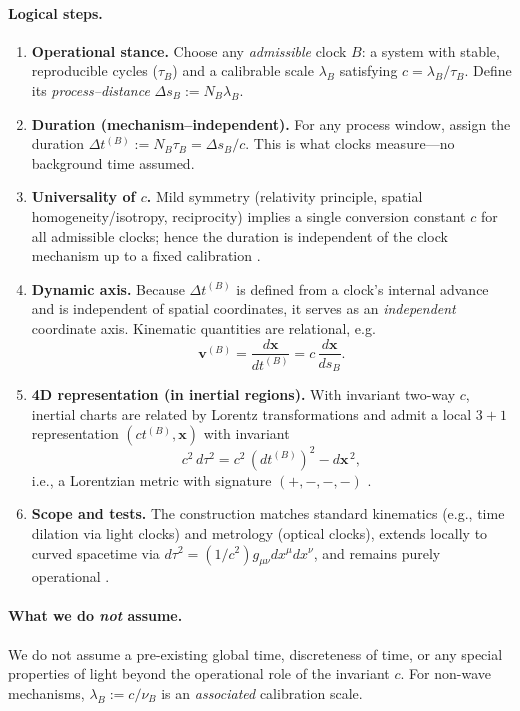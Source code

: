 \documentclass[12pt]{article}
\begin{document}
\paragraph{Logical steps.}
\begin{enumerate}
  \item \textbf{Operational stance.} Choose any \emph{admissible} clock \(B\): a system with stable, reproducible cycles (\(\tau_B\)) and a calibrable scale \(\lambda_B\) satisfying \(c=\lambda_B/\tau_B\). Define its \emph{process–distance} \(\Delta s_B:=N_B\lambda_B\).
  \item \textbf{Duration (mechanism–independent).} For any process window, assign the duration \(\Delta t^{(B)}:=N_B\tau_B=\Delta s_B/c\). This is what clocks measure—no background time assumed.
  \item \textbf{Universality of \(c\).} Mild symmetry (relativity principle, spatial homogeneity/isotropy, reciprocity) implies a single conversion constant \(c\) for all admissible clocks; hence the duration is independent of the clock mechanism up to a fixed calibration \cite{BerziGorini1969,LevyLeblond1976,Mermin1984}.
  \item \textbf{Dynamic axis.} Because \(\Delta t^{(B)}\) is defined from a clock’s internal advance and is independent of spatial coordinates, it serves as an \emph{independent} coordinate axis. Kinematic quantities are relational, e.g.
  \[
  \mathbf v^{(B)}=\frac{d\mathbf x}{dt^{(B)}}=c\,\frac{d\mathbf x}{ds_B}.
  \]
  \item \textbf{4D representation (in inertial regions).} With invariant two-way \(c\), inertial charts are related by Lorentz transformations and admit a local \(3{+}1\) representation \((ct^{(B)},\mathbf x)\) with invariant
  \[
c^2\,d\tau^2 = c^2\,(dt^{(B)})^2 - d\mathbf x^{\,2},
  \]
  i.e., a Lorentzian metric with signature \((+,-,-,-)\) \cite{Einstein1905,Rindler2006}.
  \item \textbf{Scope and tests.} The construction matches standard kinematics (e.g., time dilation via light clocks) and metrology (optical clocks), extends locally to curved spacetime via \(d\tau^2=(1/c^2)g_{\mu\nu}dx^\mu dx^\nu\), and remains purely operational \cite{Chou2010}.
\end{enumerate}

\paragraph{What we do \emph{not} assume.}
We do not assume a pre-existing global time, discreteness of time, or any special properties of light beyond the operational role of the invariant \(c\). For non-wave mechanisms, \(\lambda_B:=c/\nu_B\) is an \emph{associated} calibration scale.
\end{document}
